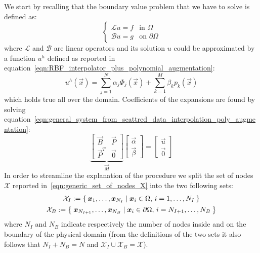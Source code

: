 We start by recalling that the boundary value problem that we have to solve is defined as:
\begin{equation}
	\label{eqn:boundary_value_problem}
	\begin{cases}
		\mathcal{L} u  = f 		 & \text{in $\Omega$} \\
		\mathcal{B} u   = g	     & \text{on $\partial\Omega$}
	\end{cases}
\end{equation}
where $\mathcal{L}$ and $\mathcal{B}$ are linear operators and its solution $u$ could be approximated by a function $u^h$ defined as reported in equation~\eqref{eqn:RBF_interpolator_plus_polynomial_augmentation}:
\begin{equation}
	\label{eqn:Kansa_interpolan}
	u^h(\vec{x}) = \sum_{j=1}^{N} \alpha_j \Phi_j(\vec{x}) + \sum_{k=1}^{M} \beta_k p_k(\vec{x})
\end{equation}
which holds true all over the domain. Coefficients of the expansions are found by solving equation~\eqref{eqn:general_system_from_scattred_data_interpolation_poly_augmentation}:
\begin{equation}
\underbrace{
	\begin{bmatrix}
		\vec{B}  & \vec{P}  \\
		\vec{P}^T  & \vec{0}
	\end{bmatrix}
}_{\vec{M}}
\begin{bmatrix}
	\vec{\alpha}  \\
	\vec{\beta}
\end{bmatrix}
=
\begin{bmatrix}
	\vec{u}  \\
	\vec{0}
\end{bmatrix}
\end{equation}
In order to streamline the explanation of the procedure we split the set of nodes $\mathcal{X}$ reported in~\eqref{eqn:generic_set_of_nodes_X} into the two following sets:
\begin{subequations}
	\begin{gather}
		\mathcal{X}_I := \Set{\boldsymbol{x}_1, \dots, \boldsymbol{x}_{N_I} \mid \boldsymbol{x}_i \in \Omega, \, i=1, \dots, N_I}  \\
		\mathcal{X}_B := \Set{\boldsymbol{x}_{N_{I+1}}, \dots, \boldsymbol{x}_{N_B} \mid \boldsymbol{x}_i \in \partial\Omega, \, i=N_{I+1}, \dots, N_B}
	\end{gather}
\end{subequations}
where $N_I$ and $N_B$ indicate respectively the number of nodes inside and on the boundary of the physical domain (from the definitions of the two sets it also follows that $N_I+N_B = N$ and $\mathcal{X}_I \cup \mathcal{X}_B = \mathcal{X}$).

